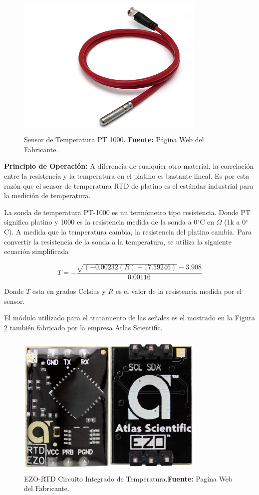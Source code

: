 \begin{figure}[t]
    \centering
    \includegraphics[width=90mm, height=70mm]{Imagenes/2021/imag39.png}
    \caption[Sensor de Temperatura PT 1000]{Sensor de Temperatura PT 1000. \textbf{Fuente: } Página Web del Fabricante. }
    \label{fig:4.15}
\end{figure}


\textbf{Principio de Operación: }
A diferencia de cualquier otro material, la correlación entre la resistencia y la temperatura en el platino es bastante lineal. Es por esta razón que el sensor de temperatura RTD de platino es el estándar industrial para la medición de temperatura.

La sonda de temperatura PT-1000 es un termómetro tipo resistencia. Donde PT significa platino y 1000 es la resistencia medida de la sonda a 0$^{\circ}$C en $\Omega$ (1k a 0$^{\circ}$C).
A medida que la temperatura cambia, la resistencia del platino cambia.
Para convertir la resistencia de la sonda a la temperatura, se utiliza la siguiente ecuación simplificada

\begin{equation}
    T=-\frac{\sqrt{(-0.00232(R)+17.59246)}-3.908}{0.00116}
\end{equation}

Donde $T$ esta en grados Celsius y $R$ es el valor de la resistencia medida por el sensor.

El módulo utilizado para el tratamiento de las señales es el mostrado en la Figura \ref{fig:4.16} también fabricado por la empresa Atlas Scientific.

\begin{figure}[t]
    \centering
    \includegraphics[width=90mm, height=70mm]{Imagenes/2021/imag38.png}
    \caption[EZO-RTD Circuito Integrado de Temperatura]{EZO-RTD Circuito Integrado de Temperatura.\textbf{Fuente: }Pagina Web del Fabricante.}
    \label{fig:4.16}
\end{figure}

